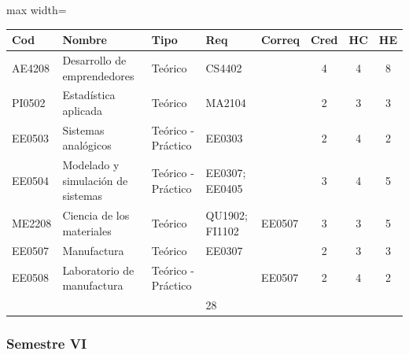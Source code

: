 \begin{center}
\small
\begin{adjustbox}{max width=\textwidth}
\begin{tabular}{|>{\RaggedRight\arraybackslash}p{1.25cm}|>{\RaggedRight\arraybackslash}p{5.2cm}|>{\RaggedRight\arraybackslash}p{1.65cm}|p{1.25cm}|p{1.25cm}|c|c|c|}
\hline
\rowcolor{grisEncabezado}
Cod & Nombre & Tipo & Req & Correq & Cred & HC & HE \\ \hline
AE4208 & Desarrollo de emprendedores & Teórico & CS4402 &  & 4 & 4 & 8 \\ \hline
\rowcolor{azulTabla}
PI0502 & Estadística aplicada & Teórico & MA2104 &  & 2 & 3 & 3 \\ \hline
EE0503 & Sistemas analógicos & Teórico - Práctico & EE0303 &  & 2 & 4 & 2 \\ \hline
\rowcolor{azulTabla}
EE0504 & Modelado y simulación de sistemas & Teórico - Práctico & EE0307; EE0405 &  & 3 & 4 & 5 \\ \hline
ME2208 & Ciencia de los materiales & Teórico & QU1902; FI1102 & EE0507 & 3 & 3 & 5 \\ \hline
\rowcolor{azulTabla}
EE0507 & Manufactura & Teórico & EE0307 &  & 2 & 3 & 3 \\ \hline
EE0508 & Laboratorio de manufactura & Teórico - Práctico &  & EE0507 & 2 & 4 & 2 \\ \hline
\rowcolor{azulTabla}
\multicolumn{5}{|l|}{Total} & 18 & 25 & 28 \\ \hline
\end{tabular}
\end{adjustbox}
\end{center}

\subsubsection*{Semestre VI}

